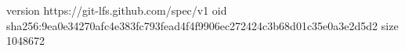 version https://git-lfs.github.com/spec/v1
oid sha256:9ea0e34270afc4e383fc793fead4f4f9906ec272424c3b68d01c35e0a3e2d5d2
size 1048672
